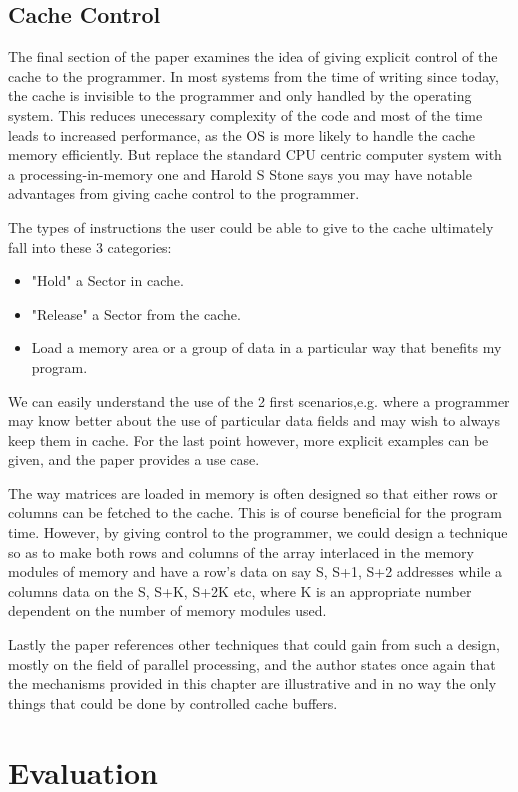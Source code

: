 \documentclass[12pt,twocolumn]{IEEEtran}
\begin{document}
\subsection{Cache Control}
The final section of the paper examines the idea of giving explicit control of the cache to the programmer. In most systems from the time of writing since today, the cache is invisible to the programmer and only handled by the operating system. This reduces unecessary complexity of the code and most of the time leads to increased performance, as the OS is more likely to handle the cache memory efficiently. But replace the standard CPU centric computer system with a processing-in-memory one and Harold S Stone says you may have notable advantages from giving cache control to the programmer.

The types of instructions the user could be able to give to the cache ultimately fall into these 3 categories:
\begin{itemize}
\item{"Hold" a Sector in cache.}
\item{"Release" a Sector from the cache.}
\item{Load a memory area or a group of data in a particular way that benefits my program.}
\end{itemize}

We can easily understand the use of the 2 first scenarios,e.g. where a programmer may know better about the use of particular data fields and may wish to always keep them in cache. For the last point however, more explicit examples can be given, and the paper provides a use case. 

The way matrices are loaded in memory is often designed so that either rows or columns can be fetched to the cache. This is of course beneficial for the program time. However, by giving control to the programmer, we could design a technique so as to make both rows and columns of the array interlaced in the memory modules of memory and have a row's data on say S, S+1, S+2 addresses while a columns data on the S, S+K, S+2K etc, where K is an appropriate number dependent on the number of memory modules used. 

Lastly the paper references other techniques that could gain from such a design, mostly on the field of parallel processing, and the author states once again that the mechanisms provided in this chapter are illustrative and in no way the only things that could be done by controlled cache buffers. 


\section{Evaluation}
\end{document}

